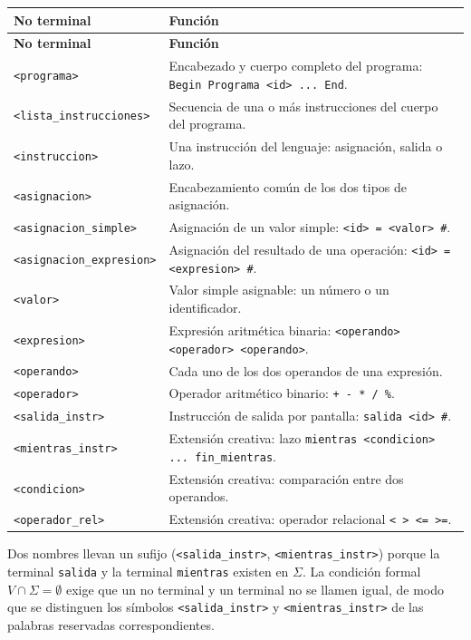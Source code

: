 \documentclass[11pt,letterpaper]{article}
\newcommand{\nt}[1]{\texttt{\textless #1\textgreater}}
\begin{document}
\begin{longtable}{|L{4.8cm}|L{\dimexpr\textwidth-4.8cm-4\arrayrulewidth\relax}|}
\hline
{}\textbf{No terminal} & \textbf{Función}\\\hline
\endfirsthead
\hline
{}\textbf{No terminal} & \textbf{Función}\\\hline
\endhead

\nt{programa} & Encabezado y cuerpo completo del programa: \texttt{Begin Programa <id> ... End}.\\\hline
\nt{lista\_instrucciones} & Secuencia de una o más instrucciones del cuerpo del programa.\\\hline
\nt{instruccion} & Una instrucción del lenguaje: asignación, salida o lazo.\\\hline
\nt{asignacion} & Encabezamiento común de los dos tipos de asignación.\\\hline
\nt{asignacion\_simple} & Asignación de un valor simple: \texttt{<id> = <valor> \#}.\\\hline
\nt{asignacion\_expresion} & Asignación del resultado de una operación: \texttt{<id> = <expresion> \#}.\\\hline
\nt{valor} & Valor simple asignable: un número o un identificador.\\\hline
\nt{expresion} & Expresión aritmética binaria: \texttt{<operando> <operador> <operando>}.\\\hline
\nt{operando} & Cada uno de los dos operandos de una expresión.\\\hline
\nt{operador} & Operador aritmético binario: \texttt{+ - * / \%}.\\\hline
\nt{salida\_instr} & Instrucción de salida por pantalla: \texttt{salida <id> \#}.\\\hline
\nt{mientras\_instr} & Extensión creativa: lazo \texttt{mientras <condicion> ... fin\_mientras}.\\\hline
\nt{condicion} & Extensión creativa: comparación entre dos operandos.\\\hline
\nt{operador\_rel} & Extensión creativa: operador relacional \texttt{< > \textless= \textgreater=}.\\\hline
\end{longtable}

Dos nombres llevan un sufijo (\nt{salida\_instr}, \nt{mientras\_instr}) porque la terminal
\texttt{salida} y la terminal \texttt{mientras} existen en $\Sigma$. La condición formal
$V\cap\Sigma=\emptyset$ exige que un no terminal y un terminal no se llamen igual, de modo que se
distinguen los símbolos \nt{salida\_instr} y \nt{mientras\_instr} de las palabras reservadas
correspondientes.
\end{document}
